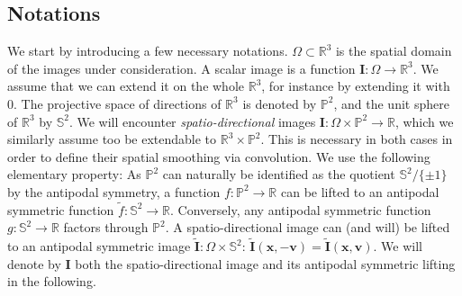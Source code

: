 \documentclass[twocolumn]{svjour3}
\begin{document}
\subsection{Notations}
We start by introducing a few necessary notations. $\Omega\subset \mathbb R^3$ is the
spatial domain of the images under consideration. A scalar image is a function
$\bm I:\Omega\to\mathbb R^3$. We assume that we can extend it on the whole $\mathbb R^3$,
for instance by extending it with 0. The projective space of directions of $\mathbb R^3$
is denoted by $\mathbb P^2$, and the unit sphere of $\mathbb R^3$ by $\mathbb S^2$.  We
will encounter \emph{spatio-directional} images
$\bm I:\Omega\times \mathbb P^2 \to \mathbb R$, which we similarly assume too be
extendable to $\mathbb R^3\times \mathbb P^2$. This is necessary in both cases in order to
define their spatial smoothing via convolution. We use the following elementary property:
As $\mathbb P^2$ can naturally be identified as the quotient $\mathbb S^2/\{\pm 1\}$ by
the antipodal symmetry, a function $f:\mathbb P^2\to \mathbb R$ can be lifted to an
antipodal symmetric function $\tilde{f}:\mathbb{S}^2\to \mathbb{R}$. Conversely, any
antipodal symmetric function $g:\mathbb S^2\to \mathbb R$ factors through $\mathbb P^2$.
A spatio-directional image can (and will) be lifted to an antipodal symmetric image
$\tilde{\bm I}:\Omega\times \mathbb S^2$:
$\tilde{\bm I}(\bm x, -\bm v) =\tilde{\bm I}(\bm x, \bm v)$.  We will denote by $\bm I$
both the spatio-directional image and its antipodal symmetric lifting in the following.
\end{document}
